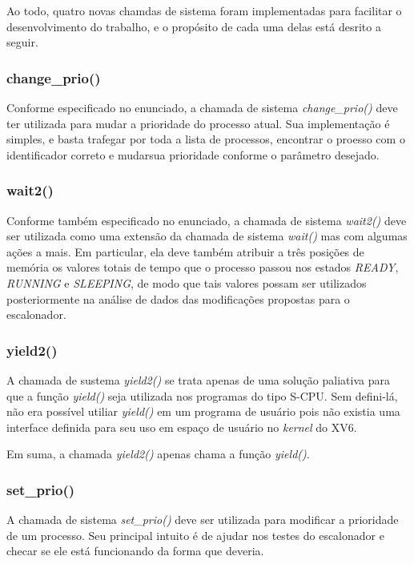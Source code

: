 \documentclass{article}
\begin{document}
Ao todo, quatro novas chamdas de sistema foram implementadas para facilitar o
desenvolvimento do trabalho, e o propósito de cada uma delas está desrito a
seguir.

\subsubsection{change\_prio()}

Conforme especificado no enunciado, a chamada de sistema
\textit{change\_prio()} deve ter utilizada para mudar
a prioridade do processo atual. Sua implementação é simples, e basta trafegar
por toda a lista de processos, encontrar o proesso com o identificador correto
e mudarsua prioridade conforme o parâmetro desejado.

\subsubsection{wait2()}

Conforme também especificado no enunciado, a chamada de sistema
\textit{wait2()} deve ser utilizada como uma
extensão da chamada de sistema \textit{wait()} mas com algumas ações a mais. Em
particular, ela deve também atribuir a três posições de memória os valores
totais de tempo que o processo passou nos estados \textit{READY},
\textit{RUNNING} e \textit{SLEEPING}, de modo que tais valores possam ser
utilizados posteriormente na análise de dados das modificações propostas para o
escalonador.

\subsubsection{yield2()}

A chamada de sustema \textit{yield2()} se trata apenas de uma solução paliativa
para que a função \textit{yield()} seja utilizada
nos programas do tipo S-CPU. Sem defini-lá, não era possível utiliar
\textit{yield()} em um programa de usuário pois não existia uma interface
definida para seu uso em espaço de usuário no \textit{kernel} do XV6.

Em suma, a chamada \textit{yield2()} apenas chama a função \textit{yield()}.

\subsubsection{set\_prio()}

A chamada de sistema \textit{set\_prio()} deve ser utilizada para modificar a
prioridade de um processo. Seu principal intuito é de ajudar nos testes do
escalonador e checar se ele está funcionando da forma que deveria.
\end{document}
